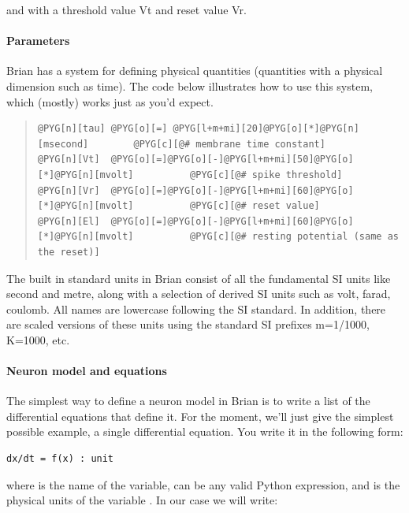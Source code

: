 \documentclass[letterpaper,10pt,english]{manual}
\begin{document}
and with a threshold value Vt and reset value Vr.


\paragraph{Parameters}

Brian has a system for defining physical quantities (quantities with
a physical dimension such as time). The code below illustrates how
to use this system, which (mostly) works just as you'd expect.
\begin{quote}

\begin{Verbatim}[commandchars=@\[\]]
@PYG[n][tau] @PYG[o][=] @PYG[l+m+mi][20]@PYG[o][*]@PYG[n][msecond]        @PYG[c][@# membrane time constant]
@PYG[n][Vt]  @PYG[o][=]@PYG[o][-]@PYG[l+m+mi][50]@PYG[o][*]@PYG[n][mvolt]          @PYG[c][@# spike threshold]
@PYG[n][Vr]  @PYG[o][=]@PYG[o][-]@PYG[l+m+mi][60]@PYG[o][*]@PYG[n][mvolt]          @PYG[c][@# reset value]
@PYG[n][El]  @PYG[o][=]@PYG[o][-]@PYG[l+m+mi][60]@PYG[o][*]@PYG[n][mvolt]          @PYG[c][@# resting potential (same as the reset)]
\end{Verbatim}
\end{quote}

The built in standard units in Brian consist of all the fundamental
SI units like second and metre, along with a selection of derived
SI units such as volt, farad, coulomb. All names are lowercase
following the SI standard. In addition, there are scaled versions
of these units using the standard SI prefixes m=1/1000, K=1000, etc.


\paragraph{Neuron model and equations}

The simplest way to define a neuron model in Brian is to write a list
of the differential equations that define it. For the moment, we'll just
give the simplest possible example, a single differential equation. You
write it in the following form:

\begin{Verbatim}[commandchars=@\[\]]
dx/dt = f(x) : unit
\end{Verbatim}

where  is the name of the variable,  can be any valid Python
expression, and  is the physical units of the variable . In our
case we will write:
\end{document}
